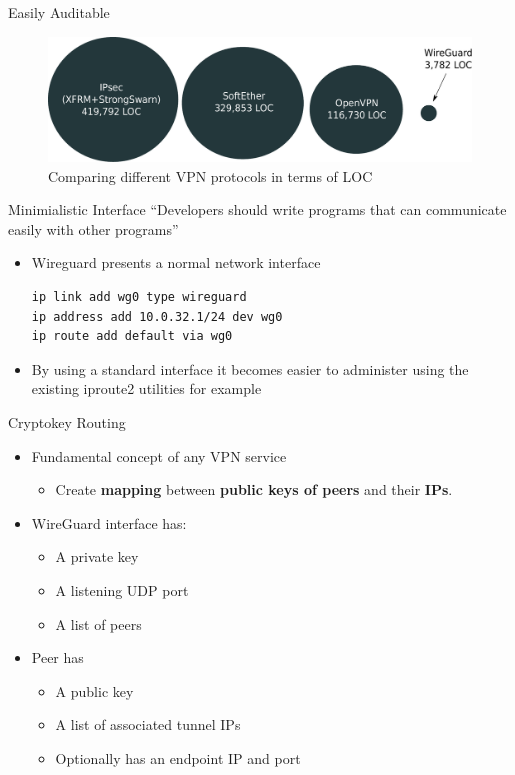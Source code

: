 \documentclass[xcolor=table]{beamer}
\begin{document}
    \begin{frame}{Easily Auditable}
        \begin{figure}
            \includegraphics[width=\textwidth]{vpn_compare.pdf}
            \caption{Comparing different VPN protocols in terms of LOC}
        \end{figure}
    \end{frame}
    \begin{frame}[fragile]{Minimialistic Interface}
    ``Developers should write programs that can communicate easily with other programs''
    \\[5pt]
        \begin{itemize}
            \item Wireguard presents a normal network interface
                \begin{verbatim}
ip link add wg0 type wireguard
ip address add 10.0.32.1/24 dev wg0
ip route add default via wg0
                \end{verbatim}
            \item By using a standard interface it becomes easier to administer using the existing iproute2 utilities for example
        \end{itemize}
    \end{frame}
    \begin{frame}{Cryptokey Routing}
        \begin{itemize}
            \item Fundamental concept of any VPN service
                \begin{itemize}
                    \item Create \textbf{mapping} between \textbf{public keys of peers} and their \textbf{IPs}.
                \end{itemize}
            \item WireGuard interface has:
                \begin{itemize}
                    \item A private key
                    \item A listening UDP port
                    \item A list of peers
                \end{itemize}
            \item Peer has
                \begin{itemize}
                    \item A public key
                    \item A list of associated tunnel IPs
                    \item Optionally has an endpoint IP and port
                \end{itemize}
        \end{itemize}
    \end{frame}
\end{document}

